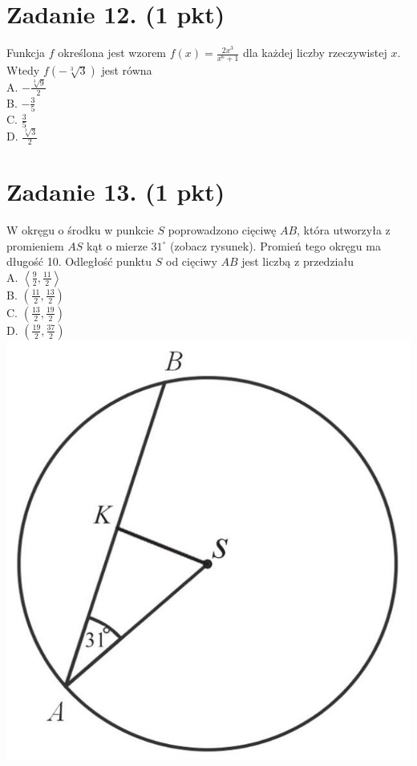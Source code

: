 \documentclass[10pt]{article}
\begin{document}
\section*{Zadanie 12. (1 pkt)}
Funkcja \(f\) określona jest wzorem \(f(x)=\frac{2 x^{3}}{x^{6}+1}\) dla każdej liczby rzeczywistej \(x\). Wtedy \(f(-\sqrt[3]{3})\) jest równa\\
A. \(-\frac{\sqrt[3]{9}}{2}\)\\
B. \(-\frac{3}{5}\)\\
C. \(\frac{3}{5}\)\\
D. \(\frac{\sqrt[3]{3}}{2}\)

\section*{Zadanie 13. (1 pkt)}
W okręgu o środku w punkcie \(S\) poprowadzono cięciwę \(A B\), która utworzyła z promieniem \(A S\) kąt o mierze \(31^{\circ}\) (zobacz rysunek). Promień tego okręgu ma długość 10. Odległość punktu \(S\) od cięciwy \(A B\) jest liczbą z przedziału\\
A. \(\left\langle\frac{9}{2}, \frac{11}{2}\right\rangle\)\\
B. \(\left(\frac{11}{2}, \frac{13}{2}\right)\)\\
C. \(\left(\frac{13}{2}, \frac{19}{2}\right)\)\\
D. \(\left(\frac{19}{2}, \frac{37}{2}\right)\)\\
\includegraphics[max width=\textwidth, center]{2024_11_21_779b7f825da3a12753feg-06(1)}
\end{document}
